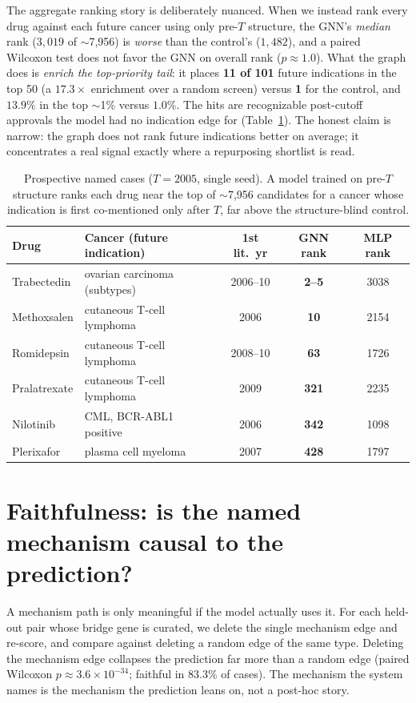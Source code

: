 \documentclass[11pt]{article}
\begin{document}
The aggregate ranking story is deliberately nuanced. When we instead rank every drug against
each future cancer using only pre-$T$ structure, the GNN's \emph{median} rank ($3{,}019$ of
$\sim$7{,}956) is \emph{worse} than the control's ($1{,}482$), and a paired Wilcoxon test
does not favor the GNN on overall rank ($p\approx1.0$). What the graph does is
\emph{enrich the top-priority tail}: it places \textbf{11 of 101} future indications in the
top 50 (a $17.3\times$ enrichment over a random screen) versus \textbf{1} for the control,
and $13.9\%$ in the top $\sim$1\% versus $1.0\%$. The hits are recognizable post-cutoff
approvals the model had no indication edge for (Table~\ref{tab:cases}). The honest claim is
narrow: the graph does not rank future indications better on average; it concentrates a real
signal exactly where a repurposing shortlist is read.

\begin{table}[t]
\centering\small
\caption{Prospective named cases ($T=2005$, single seed). A model trained on pre-$T$
structure ranks each drug near the top of $\sim$7{,}956 candidates for a cancer whose
indication is first co-mentioned only after $T$, far above the structure-blind control.}
\label{tab:cases}
\begin{tabular}{llccc}
\toprule
\textbf{Drug} & \textbf{Cancer (future indication)} & \textbf{1st lit.\ yr} & \textbf{GNN rank} & \textbf{MLP rank}\\
\midrule
Trabectedin & ovarian carcinoma (subtypes) & 2006--10 & \textbf{2--5} & 3038\\
Methoxsalen & cutaneous T-cell lymphoma & 2006 & \textbf{10} & 2154\\
Romidepsin & cutaneous T-cell lymphoma & 2008--10 & \textbf{63} & 1726\\
Pralatrexate & cutaneous T-cell lymphoma & 2009 & \textbf{321} & 2235\\
Nilotinib & CML, BCR-ABL1 positive & 2006 & \textbf{342} & 1098\\
Plerixafor & plasma cell myeloma & 2007 & \textbf{428} & 1797\\
\bottomrule
\end{tabular}
\end{table}

\section{Faithfulness: is the named mechanism causal to the prediction?}\label{sec:faith}
A mechanism path is only meaningful if the model actually uses it. For each held-out pair
whose bridge gene is curated, we delete the single mechanism edge and re-score, and compare
against deleting a random edge of the same type. Deleting the mechanism edge collapses the
prediction far more than a random edge (paired Wilcoxon $p\approx3.6\times10^{-34}$; faithful
in $83.3\%$ of cases). The mechanism the system names is the mechanism the prediction leans
on, not a post-hoc story.
\end{document}
